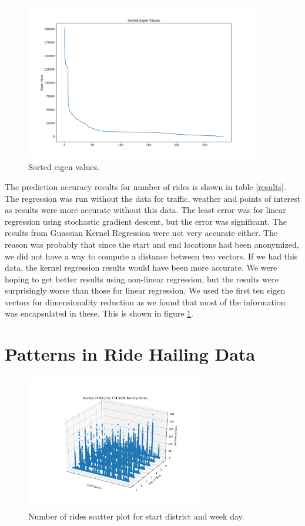 \documentclass[paper=a4, fontsize=11pt]{scrartcl} %
\numberwithin{equation}{section} %
\numberwithin{table}{section} %
\begin{document}
\begin{figure}[!htb]
\centering
\includegraphics[width=4in]{figures/EigenValues.png}
\caption{Sorted eigen values.}
\label{eigen10}
\end{figure}

The prediction accuracy results for number of rides is shown in table \ref{results}. The regression was run without the data for traffic, weather and points of interest as results were more accurate without this data. The least error was for linear regression using stochastic gradient descent, but the error was significant. The results from Guassian Kernel Regression were not very accurate either. The reason was probably that since the start and end locations had been anonymized, we did not have a way to compute a distance between two vectors. If we had this data, the kernel regression results would have been more accurate. We were hoping to get better results using non-linear regression, but the results were surprisingly worse than those for linear regression. We used the first ten eigen vectors for dimensionality reduction as we found that most of the information was encapsulated in these. This is shown in figure \ref{eigen10}.
\section{Patterns in Ride Hailing Data}

\begin{figure}[!htb]
\centering
\includegraphics[width=3in]{figures/Ridesfordistrictsandweekdays3DScatter.png}
\caption{Number of rides scatter plot for start district and week day.}
\label{rides2}
\end{figure}
\end{document}

